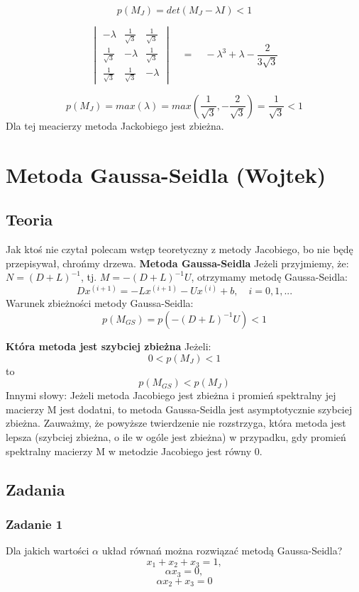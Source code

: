 \documentclass[a4paper]{article}
\begin{document}
$$ p(M_J) = det(M_J - \lambda I)<1$$

$$
\begin{vmatrix}
-\lambda & \frac{1}{\sqrt{3}} &  \frac{1}{\sqrt{3}} \\
 \frac{1}{\sqrt{3}} & -\lambda &  \frac{1}{\sqrt{3}} \\
 \frac{1}{\sqrt{3}} &  \frac{1}{\sqrt{3}} & -\lambda
\end{vmatrix}
\quad = \quad -\lambda^3 + \lambda - \frac{2}{3\sqrt{3}}
$$

$$ p(M_J) = max(\lambda) = max( \frac{1}{\sqrt{3}},-\frac{2}{\sqrt{3}}) = \frac{1}{\sqrt{3}} <1 $$
Dla tej meacierzy metoda Jackobiego jest zbieżna.

\section{Metoda Gaussa-Seidla (Wojtek)}
\subsection{Teoria}
Jak ktoś nie czytał polecam wstęp teoretyczny z metody Jacobiego, bo nie będę przepisywał, chrońmy drzewa. \newline
\textbf{Metoda Gaussa-Seidla}\newline
Jeżeli przyjmiemy, że: $N = (D+L)^{-1}$, tj. $M = -(D+L)^{-1}U$, otrzymamy metodę Gaussa-Seidla:
$$ Dx^{(i+1)} = -Lx^{(i+1)} - Ux^{(i)} + b,\quad i=0,1,...$$
Warunek zbieżności metody Gaussa-Seidla:
$$ p(M_{GS}) = p(-(D+L)^{-1}U) <1 $$

\textbf{Która metoda jest szybciej zbieżna}\newline
Jeżeli: $$ 0<p(M_J)<1$$
to $$ p(M_{GS}) < p(M_J) $$
Innymi słowy: Jeżeli metoda Jacobiego jest zbieżna i promień spektralny jej macierzy M jest dodatni, to metoda Gaussa-Seidla jest asymptotycznie szybciej zbieżna.
Zauważmy, że powyższe twierdzenie nie rozstrzyga, która metoda jest lepsza (szybciej zbieżna, o ile w ogóle jest zbieżna) w przypadku, gdy promień spektralny macierzy M w metodzie Jacobiego jest równy 0.


\subsection{Zadania}

\subsubsection{Zadanie 1} 
Dla jakich wartości $\alpha$ układ równań można rozwiązać metodą Gaussa-Seidla?
$$x_1 + x_2 + x_3 = 1, $$
$$ \alpha x_3 = 0, $$
$$ \alpha x_2 + x_3 = 0 $$
\end{document}

